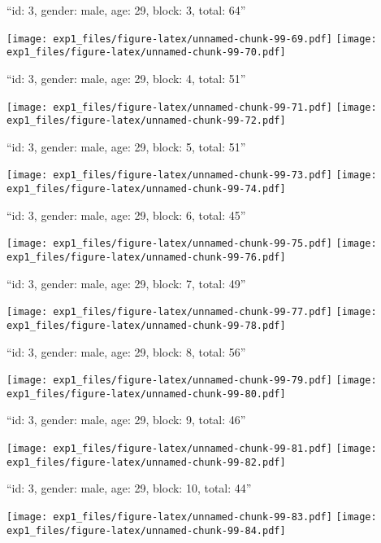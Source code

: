 \documentclass[,]{article}
\begin{document}
\newpage
[1] 

``id: 3, gender: male, age: 29, block: 3, total: 64''

\texttt{[image: exp1\_files/figure-latex/unnamed-chunk-99-69.pdf]}
\texttt{[image: exp1\_files/figure-latex/unnamed-chunk-99-70.pdf]}

\newpage
[1] 

``id: 3, gender: male, age: 29, block: 4, total: 51''

\texttt{[image: exp1\_files/figure-latex/unnamed-chunk-99-71.pdf]}
\texttt{[image: exp1\_files/figure-latex/unnamed-chunk-99-72.pdf]}

\newpage
[1] 

``id: 3, gender: male, age: 29, block: 5, total: 51''

\texttt{[image: exp1\_files/figure-latex/unnamed-chunk-99-73.pdf]}
\texttt{[image: exp1\_files/figure-latex/unnamed-chunk-99-74.pdf]}

\newpage
[1] 

``id: 3, gender: male, age: 29, block: 6, total: 45''

\texttt{[image: exp1\_files/figure-latex/unnamed-chunk-99-75.pdf]}
\texttt{[image: exp1\_files/figure-latex/unnamed-chunk-99-76.pdf]}

\newpage
[1] 

``id: 3, gender: male, age: 29, block: 7, total: 49''

\texttt{[image: exp1\_files/figure-latex/unnamed-chunk-99-77.pdf]}
\texttt{[image: exp1\_files/figure-latex/unnamed-chunk-99-78.pdf]}

\newpage
[1] 

``id: 3, gender: male, age: 29, block: 8, total: 56''

\texttt{[image: exp1\_files/figure-latex/unnamed-chunk-99-79.pdf]}
\texttt{[image: exp1\_files/figure-latex/unnamed-chunk-99-80.pdf]}

\newpage
[1] 

``id: 3, gender: male, age: 29, block: 9, total: 46''

\texttt{[image: exp1\_files/figure-latex/unnamed-chunk-99-81.pdf]}
\texttt{[image: exp1\_files/figure-latex/unnamed-chunk-99-82.pdf]}

\newpage
[1] 

``id: 3, gender: male, age: 29, block: 10, total: 44''

\texttt{[image: exp1\_files/figure-latex/unnamed-chunk-99-83.pdf]}
\texttt{[image: exp1\_files/figure-latex/unnamed-chunk-99-84.pdf]}

\newpage
[1] 
\end{document}
